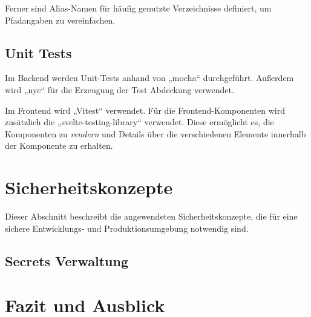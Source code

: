 \documentclass[a4paper, 10pt, conference]{IEEEtran}
\begin{document}
Ferner sind Alias-Namen für häufig genutzte Verzeichnisse definiert, um Pfadangaben zu vereinfachen.

\subsection{Unit Tests}

Im Backend werden Unit-Tests anhand von „mocha“ \cite{mochajs} durchgeführt. Außerdem wird „nyc“ \cite{instanbuljs} für die Erzeugung der Test Abdeckung verwendet. 

Im Frontend wird „Vitest“ \cite{vitest} verwendet. Für die Frontend-Komponenten wird zusätzlich die „svelte-testing-library“ \cite{stl} verwendet. Diese ermöglicht es, die Komponenten zu \textit{rendern} und Details über die verschiedenen Elemente innerhalb der Komponente zu erhalten.

\section{Sicherheitskonzepte} \label{s:sicherheitskonzepte}

Dieser Abschnitt beschreibt die angewendeten Sicherheitskonzepte, die für eine sichere Entwicklungs- und Produktionsumgebung notwendig sind.

\subsection{Secrets Verwaltung}


\section{Fazit und Ausblick} \label{s:fazit}


\printbibliography
\end{document}

